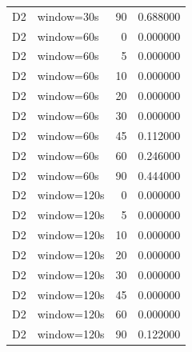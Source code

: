 \begin{tabular}{llrr}
D2 & window=30s & 90 & 0.688000 \\
D2 & window=60s & 0 & 0.000000 \\
D2 & window=60s & 5 & 0.000000 \\
D2 & window=60s & 10 & 0.000000 \\
D2 & window=60s & 20 & 0.000000 \\
D2 & window=60s & 30 & 0.000000 \\
D2 & window=60s & 45 & 0.112000 \\
D2 & window=60s & 60 & 0.246000 \\
D2 & window=60s & 90 & 0.444000 \\
D2 & window=120s & 0 & 0.000000 \\
D2 & window=120s & 5 & 0.000000 \\
D2 & window=120s & 10 & 0.000000 \\
D2 & window=120s & 20 & 0.000000 \\
D2 & window=120s & 30 & 0.000000 \\
D2 & window=120s & 45 & 0.000000 \\
D2 & window=120s & 60 & 0.000000 \\
D2 & window=120s & 90 & 0.122000 \\
\bottomrule
\end{tabular}
